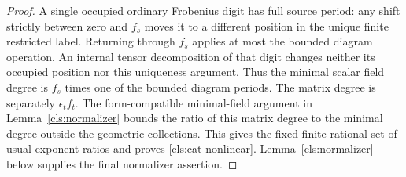 \begin{proof}
A single occupied ordinary Frobenius digit has full source period:
any shift strictly between zero and $f_s$ moves it to a different
position in the unique finite restricted label.  Returning through
$f_s$ applies at most the bounded diagram operation.  An internal
tensor decomposition of that digit changes neither its occupied
position nor this uniqueness argument.  Thus the minimal scalar
field degree is $f_s$ times one of the bounded diagram periods.
The matrix degree is separately $\epsilon_t f_t$.  The
form-compatible minimal-field argument in
Lemma~\ref{cls:normalizer} bounds the ratio of this matrix degree
to the minimal degree outside the geometric collections.
This gives the fixed finite rational set of usual exponent ratios
and proves \ref{cls:cat-nonlinear}.
Lemma~\ref{cls:normalizer} below supplies
the final normalizer assertion.
\end{proof}

